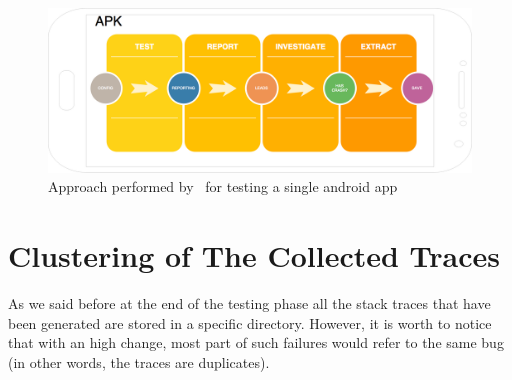 \begin{figure}[tb]
\centering 
\includegraphics[width=\columnwidth]{imgs/apkprocess} 
\caption{Approach performed by \toolname\ for testing a single android app}
\label{fig: apkprocess}
\end{figure}






\section{Clustering of The Collected Traces}
\label{approach:clustering}
As we said before at the end of the testing phase all the stack traces that have been generated are stored in a specific directory. However, it is worth to notice that with an high change, most part of such failures would refer to the same bug (in other words, the traces are duplicates).

